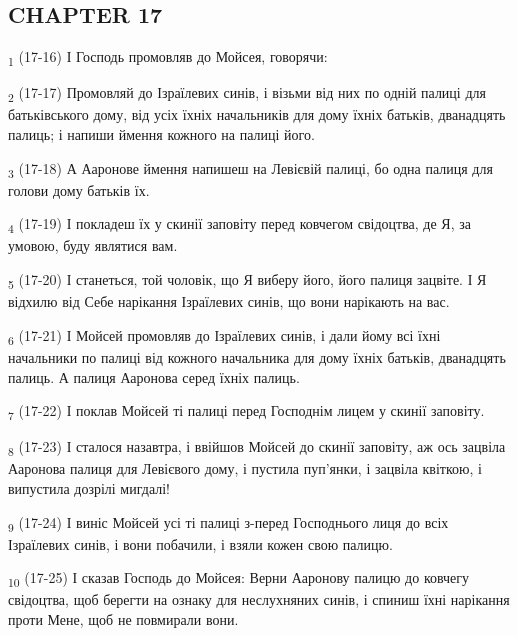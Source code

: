 \subsection{CHAPTER 17}
\begin{tcolorbox}
\textsubscript{1} (17-16) І Господь промовляв до Мойсея, говорячи:
\end{tcolorbox}
\begin{tcolorbox}
\textsubscript{2} (17-17) Промовляй до Ізраїлевих синів, і візьми від них по одній палиці для батьківського дому, від усіх їхніх начальників для дому їхніх батьків, дванадцять палиць; і напиши ймення кожного на палиці його.
\end{tcolorbox}
\begin{tcolorbox}
\textsubscript{3} (17-18) А Ааронове ймення напишеш на Левієвій палиці, бо одна палиця для голови дому батьків їх.
\end{tcolorbox}
\begin{tcolorbox}
\textsubscript{4} (17-19) І покладеш їх у скинії заповіту перед ковчегом свідоцтва, де Я, за умовою, буду являтися вам.
\end{tcolorbox}
\begin{tcolorbox}
\textsubscript{5} (17-20) І станеться, той чоловік, що Я виберу його, його палиця зацвіте. І Я відхилю від Себе нарікання Ізраїлевих синів, що вони нарікають на вас.
\end{tcolorbox}
\begin{tcolorbox}
\textsubscript{6} (17-21) І Мойсей промовляв до Ізраїлевих синів, і дали йому всі їхні начальники по палиці від кожного начальника для дому їхніх батьків, дванадцять палиць. А палиця Ааронова серед їхніх палиць.
\end{tcolorbox}
\begin{tcolorbox}
\textsubscript{7} (17-22) І поклав Мойсей ті палиці перед Господнім лицем у скинії заповіту.
\end{tcolorbox}
\begin{tcolorbox}
\textsubscript{8} (17-23) І сталося назавтра, і ввійшов Мойсей до скинії заповіту, аж ось зацвіла Ааронова палиця для Левієвого дому, і пустила пуп'янки, і зацвіла квіткою, і випустила дозрілі мигдалі!
\end{tcolorbox}
\begin{tcolorbox}
\textsubscript{9} (17-24) І виніс Мойсей усі ті палиці з-перед Господнього лиця до всіх Ізраїлевих синів, і вони побачили, і взяли кожен свою палицю.
\end{tcolorbox}
\begin{tcolorbox}
\textsubscript{10} (17-25) І сказав Господь до Мойсея: Верни Ааронову палицю до ковчегу свідоцтва, щоб берегти на ознаку для неслухняних синів, і спиниш їхні нарікання проти Мене, щоб не повмирали вони.
\end{tcolorbox}
